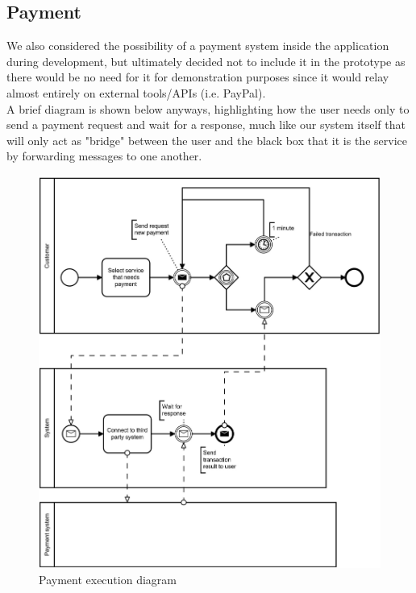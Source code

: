 \subsection{Payment}
We also considered the possibility of a payment system inside the application during development, but ultimately decided not to include it in the prototype as there would be no need for it for demonstration purposes since it would relay almost entirely on external tools/APIs (i.e. PayPal).\\
A brief diagram is shown below anyways, highlighting how the user needs only to send a payment request and wait for a response, much like our system itself that will only act as "bridge" between the user and the black box that it is the service by forwarding messages to one another.
\begin{figure}[!htb]
\centering
\includegraphics[width=1.0\textwidth]{Img/DiagramPayment.jpg}
\caption{Payment execution diagram}
\end{figure}
